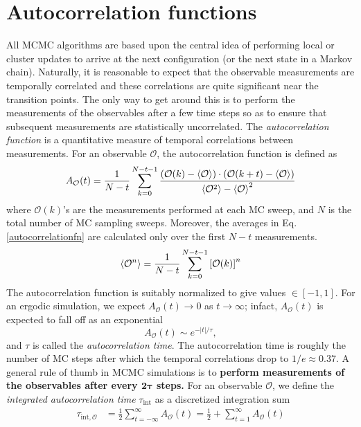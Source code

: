 \documentclass[../journal_main.tex]{subfiles}
\begin{document}
\section{Autocorrelation functions}
All MCMC algorithms are based upon the central idea of performing local or cluster updates to arrive at the next configuration (or the next state in a Markov chain). Naturally, it is reasonable to expect that the observable measurements are temporally correlated and these correlations are quite significant near the transition points. The only way to get around this is to perform the measurements of the observables after a few time steps so as to ensure that subsequent measurements are statistically uncorrelated.  The \textit{autocorrelation function} is a quantitative measure of temporal correlations between measurements. For an observable $\mathcal{O}$, the autocorrelation function is defined as
\begin{equation}
    A_\mathcal{O}(t) =   \frac{1}{N-t} \sum_{k=0}^{N-t-1}\frac{\qty(\mathcal{O}(k) - \expval{\mathcal{O}})\cdot\qty(\mathcal{O}(k+t) - \expval{\mathcal{O}})}{\expval{\mathcal{O}^2} - \expval{\mathcal{O}}^2}
    \label{autocorrelationfn}
\end{equation}  
where $\mathcal{O}(k)$'s are the measurements performed at each MC sweep, and $N$ is the total number of MC sampling sweeps. Moreover, the averages in Eq. \eqref{autocorrelationfn} are calculated only over the first $N-t$ measurements. 
\begin{equation}
    \expval{\mathcal{O}^n} = \frac{1}{N-t} \sum_{k=0}^{N-t-1} \qty[\mathcal{O}(k)]^n
\end{equation}
The autocorrelation function is suitably normalized to give values $\in [-1,1]$. For an ergodic simulation, we expect $A_\mathcal{O}(t) \to 0$ as $t \to \infty$; infact, $A_\mathcal{O}(t)$ is expected to fall off as an exponential
\begin{equation}
    A_\mathcal{O}(t) \sim e^{-|t|/\tau },
\end{equation}
and $\tau $ is called the \textit{autocorrelation time}. The autocorrelation time is roughly the number of MC steps after which the temporal correlations drop to $1/e \approx 0.37$. A general rule of thumb in MCMC simulations is to \textbf{perform measurements of the observables after every $\boldsymbol{2} \boldsymbol{\tau}$ steps.} For an observable $\mathcal{O}$, we define the \textit{integrated autocorrelation time} $\tau_\text{int}$ as a discretized integration sum
\begin{align}
    \tau _{\text{int},\mathcal{O}} & = \frac{1}{2} \sum_{t= -\infty}^{\infty} A_\mathcal{O}(t) = \frac{1}{2} + \sum_{t=1}^{\infty} A_\mathcal{O}(t) 
    \label{autocorsum}
\end{align}   
\end{document}
